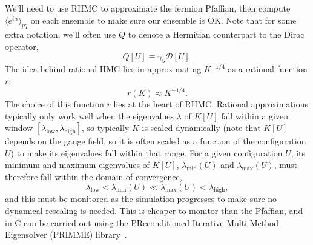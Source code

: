 We'll need to use RHMC to approximate the fermion Pfaffian, then compute $\langle e^{i\alpha} \rangle_{pq}$ on each ensemble to make sure our ensemble is OK. Note that for some extra notation, we'll often use $Q$ to denote a Hermitian counterpart to the Dirac operator,
\begin{equation}
	Q[U] \equiv \gamma_5 \mathcal D[U].
\end{equation}
The idea behind rational HMC lies in approximating $K^{-1/4}$ as a rational function $r$:
\begin{equation}
	r(K) \approx K^{-1/4}. 
\end{equation}
The choice of this function $r$ lies at the heart of RHMC. Rational approximations typically only work well when the eigenvalues $\lambda$ of $K[U]$ fall within a given window $[\lambda_{\mathrm{low}}, \lambda_{\mathrm{high}}]$, so typically $K$ is scaled dynamically (note that $K[U]$ depends on the gauge field, so it is often scaled as a function of the configuration $U$) to make its eigenvalues fall within that range. For a given configuration $U$, its minimum and maximum eigenvalues of $K[U]$, $\lambda_\mathrm{min}(U)$ and $\lambda_\mathrm{max}(U)$, must therefore fall within the domain of convergence,
\begin{equation}
	\lambda_\mathrm{low} < \lambda_\mathrm{min}(U) \ll \lambda_\mathrm{max}(U) < \lambda_\mathrm{high},
\end{equation}
and this must be monitored as the simulation progresses to make sure no dynamical rescaling is needed. This is cheaper to monitor than the Pfaffian, and in C can be carried out using the PReconditioned Iterative Multi-Method Eigensolver (PRIMME) library~\cite{10.1145/1731022.1731031}. 

